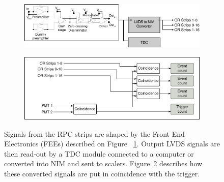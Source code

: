 			\begin{figure}[!h]
			\begin{subfigure}{\linewidth}
				\begin{center}
					\includegraphics[width = \plotwidth]{fig/pulse-processing.pdf}\\
					\caption{\label{fig:DAQ:A}}
				\end{center}
			\end{subfigure}
			\begin{subfigure}{\linewidth}
				\begin{center}
					\includegraphics[width = \plotwidth]{fig/pulse-processing-2.pdf}
					\caption{\label{fig:DAQ:B}}
				\end{center}
			\end{subfigure}
			\caption{\label{fig:DAQ} Signals from the RPC strips are shaped by the Front End Electronics (FEEs) described on Figure ~\ref{fig:DAQ:A}. Output LVDS signals are then read-out by a TDC module connected to a computer or converted into NIM and sent to scalers. Figure~\ref{fig:DAQ:B} describes how these converted signals are put in coincidence with the trigger.}
		\end{figure}
		
